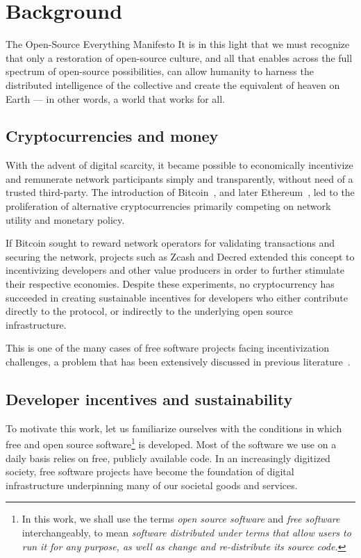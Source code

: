 \section{Background}

\begin{epigraph}{The Open-Source Everything Manifesto}
    \noindent It is in this light that we must recognize that only a restoration of
    open-source culture, and all that enables across the full spectrum of
    open-source possibilities, can allow humanity to harness the distributed
    intelligence of the collective and create the equivalent of heaven on Earth
    --- in other words, a world that works for all.
\end{epigraph}

\subsection{Cryptocurrencies and money}

With the advent of digital scarcity, it became possible to economically
incentivize and remunerate network participants simply and transparently,
without need of a trusted third-party. The introduction of
Bitcoin~\cite{bitcoin}, and later Ethereum~\cite{ethereum}, led to the
proliferation of alternative cryptocurrencies primarily competing on network
utility and monetary policy.

If Bitcoin sought to reward network operators for
validating transactions and securing the network, projects such as Zcash and
Decred extended this concept to incentivizing developers and other value producers
in order to further stimulate their respective economies. Despite these experiments,
no cryptocurrency has succeeded in creating sustainable incentives for
developers who either contribute directly to the protocol, or indirectly to the
underlying open source infrastructure.

This is one of the many cases of free software projects facing incentivization
challenges, a problem that has been extensively discussed in previous
literature~\cite{roads and bridges}.

\subsection{Developer incentives and sustainability}
\label{s:incentives}

To motivate this work, let us familiarize ourselves with the
conditions in which free and open source software\footnote{In this work, we
shall use the terms \emph{open source software} and \emph{free software} interchangeably,
to mean \emph{software distributed under terms that allow users to run it
for any purpose, as well as change and re-distribute its source code.}}
is developed. Most of the software we use on a daily basis relies on free,
publicly available code. In an increasingly digitized society, free software
projects have become the foundation of digital infrastructure underpinning many
of our societal goods and services.

